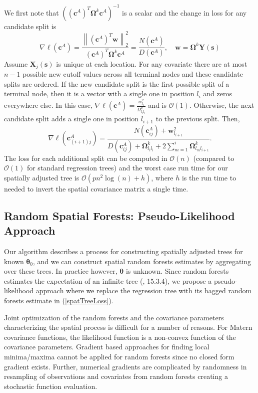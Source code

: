 \documentclass[12pt]{article}
\newcommand{\proc}{\mathbf{Y}(\mathbf{s})}
\newcommand{\pars}{\boldsymbol{\theta}}
\newcommand{\Om}{\boldsymbol{\Omega}}
\newcommand{\ca}{\mathbf{c}^A}
\newcommand{\cat}{ \left(\mathbf{c}^A\right)^T}
\begin{document}
We first note that $\left( \cat \Om^k \ca \right)^{-1}$ is a scalar and the change in loss for any candidate split is
$$\nabla \ell(\ca) =  \frac{\left\| \cat\mathbf{w} \right\|_2^2}{\cat \Om^k \ca } =\frac{N(\ca)}{D(\ca)}, \quad \mathbf{w} = \Om^k \proc$$
Assume $\mathbf{X}_j(\mathbf{s})$ is unique at each location. For any covariate there are at most $n-1$ possible new cutoff values across all terminal nodes and these candidate splits are ordered. If the new candidate split is the first possible split of a terminal node, then it is a vector with a single one in position $l_i$ and zeros everywhere else. In this case, $\nabla \ell(\ca) = \frac{w^2_{l_i}}{\Omega^k_{l_i l_i}} $ and is $\mathcal{O}(1)$.  Otherwise, the next candidate split adds a single one in position $l_{i+1}$ to the previous split.  Then,
$$ \nabla \ell(\ca_{(i+1)j}) = \frac{ N (\ca_{ij}) + \mathbf{w}^2_{l_{i+1}}} { D (\ca_{ij}) + \Om^k_{l_il_i} + 2 \sum\limits_{m=1}^{i} \Om^k_{ l_m l_{i+1} }}.$$
The loss for each additional split can be computed in $\mathcal{O}(n)$ (compared to $\mathcal{O}(1)$ for standard regression trees) and the worst case run time for our spatially adjusted tree is $\mathcal{O}(pn^2 \log(n) +h)$, where $h$ is the run time to needed to invert the spatial covariance matrix a single time.  

\subsection{Random Spatial Forests: Pseudo-Likelihood Approach}
\label{spatRFPL}

Our algorithm describes a process for constructing spatially adjusted trees for known $\pars_0$, and we can construct spatial random forests estimates by aggregating over these trees. In practice however, $\pars$ is unknown. Since random forests estimates the expectation of an infinite tree (\cite{hastie2005elements}, 15.3.4), we propose a pseudo-likelihood approach where we replace the regression tree with its bagged random forests estimate in (\ref{spatTreeLoss}). 

Joint optimization of the random forests and the covariance parameters characterizing the spatial process is difficult for a number of reasons. For Matern covariance functions, the likelihood function is a non-convex function of the covariance parameters. Gradient based approaches for finding local minima/maxima cannot be applied for random forests since no closed form gradient exists. Further, numerical gradients are complicated by randomness in resampling of observations and covariates from random forests creating a stochastic function evaluation. 
\end{document}
